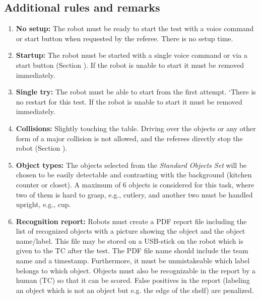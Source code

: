 \subsection{Additional rules and remarks}
\label{sattu:add}
\begin{enumerate}
\item \textbf{No setup:} The robot must be ready to start the test with a voice command or start button when requested by the referee. There is no setup time.
\item \textbf{Startup:} The robot must be started with a single voice command or via a start button (Section ). If the robot is unable to start it must be removed immediately.
\item \textbf{Single try:} The robot must be able to start from the first attempt. 
`There is no restart for this test. If the robot is unable to start it must be removed immediately.
\item \textbf{Collisions:} Slightly touching the table.
  Driving over the objects or any other form of a major collision is not allowed, and the referees directly stop the robot (Section ).
\item\label{sattu:objs} \textbf{Object types:} The objects selected from the \textit{Standard Objects Set} will be chosen to be easily detectable and contrasting with the background (kitchen counter or closet). A maximum of 6 objects is considered for this task, where two of them is hard to grasp, e.g., cutlery, and another two must be handled upright, e.g., cup.
\item \textbf{Recognition report:} Robots must create a PDF report file including the list of recognized objects with a picture showing the object and the object name/label.
  This file may be stored on a USB-stick on the robot which is given to the TC after the test. The PDF file name should include the team name and a timestamp. 
  Furthermore, it must be unmistakeable which label belongs to which object. Objects must also be recognizable in the report by a human (TC) so that it can be scored. 
False positives in the report (labeling an object which is not an object but e.g. the edge of the shelf) are penalized.

\end{enumerate}
